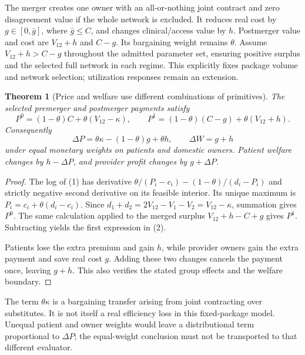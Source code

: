 \documentclass[11pt]{article}
\newtheorem{theorem}{Theorem}
\theoremstyle{definition}
\begin{document}
The merger creates one owner with an all-or-nothing joint contract and zero disagreement value if the whole network is excluded. It reduces real cost by $g\in[0,\bar g]$, where $\bar g\leq C$, and changes clinical/access value by $h$. Postmerger value and cost are $V_{12}+h$ and $C-g$. Its bargaining weight remains $\theta$. Assume $V_{12}+h>C-g$ throughout the admitted parameter set, ensuring positive surplus and the selected full network in each regime. This explicitly fixes package volume and network selection; utilization responses remain an extension.

\begin{theorem}[Price and welfare use different combinations of primitives]
The selected premerger and postmerger payments satisfy
\[
 P^0=(1-\theta)C+\theta(V_{12}-\kappa),\qquad
 P^1=(1-\theta)(C-g)+\theta(V_{12}+h).
\]
Consequently
\[
 \Delta P=\theta\kappa-(1-\theta)g+\theta h,
 \qquad \Delta W=g+h
 \tag{2}
\]
under equal monetary weights on patients and domestic owners. Patient welfare changes by $h-\Delta P$, and provider profit changes by $g+\Delta P$.
\end{theorem}
\begin{proof}
The log of (1) has derivative $\theta/(P_i-c_i)-(1-\theta)/(d_i-P_i)$ and strictly negative second derivative on its feasible interior. Its unique maximum is $P_i=c_i+\theta(d_i-c_i)$. Since $d_1+d_2=2V_{12}-V_1-V_2=V_{12}-\kappa$, summation gives $P^0$. The same calculation applied to the merged surplus $V_{12}+h-C+g$ gives $P^1$. Subtracting yields the first expression in (2).

Patients lose the extra premium and gain $h$, while provider owners gain the extra payment and save real cost $g$. Adding these two changes cancels the payment once, leaving $g+h$. This also verifies the stated group effects and the welfare boundary.
\end{proof}

The term $\theta\kappa$ is a bargaining transfer arising from joint contracting over substitutes. It is not itself a real efficiency loss in this fixed-package model. Unequal patient and owner weights would leave a distributional term proportional to $\Delta P$; the equal-weight conclusion must not be transported to that different evaluator.
\end{document}
